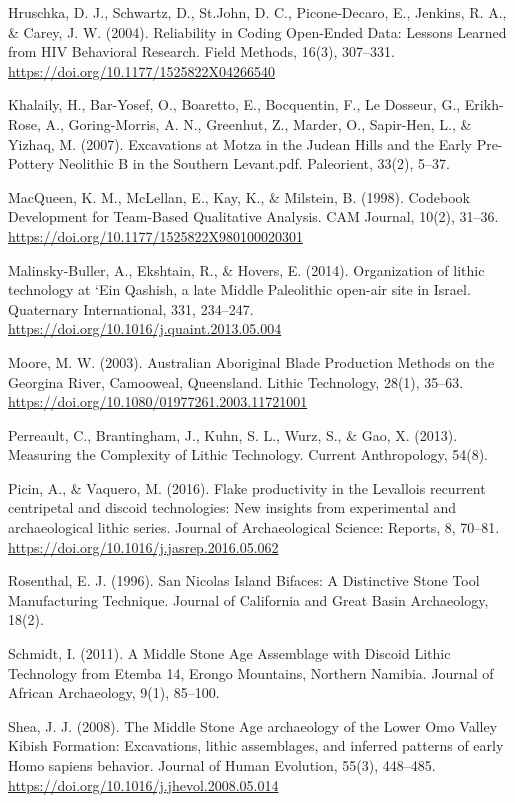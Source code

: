 \documentclass[
]{article}
\begin{document}
Hruschka, D. J., Schwartz, D., St.John, D. C., Picone-Decaro, E.,
Jenkins, R. A., \& Carey, J. W. (2004). Reliability in Coding Open-Ended
Data: Lessons Learned from HIV Behavioral Research. Field Methods,
16(3), 307--331. \url{https://doi.org/10.1177/1525822X04266540}

Khalaily, H., Bar-Yosef, O., Boaretto, E., Bocquentin, F., Le Dosseur,
G., Erikh-Rose, A., Goring-Morris, A. N., Greenhut, Z., Marder, O.,
Sapir-Hen, L., \& Yizhaq, M. (2007). Excavations at Motza in the Judean
Hills and the Early Pre-Pottery Neolithic B in the Southern Levant.pdf.
Paleorient, 33(2), 5--37.

MacQueen, K. M., McLellan, E., Kay, K., \& Milstein, B. (1998). Codebook
Development for Team-Based Qualitative Analysis. CAM Journal, 10(2),
31--36. \url{https://doi.org/10.1177/1525822X980100020301}

Malinsky-Buller, A., Ekshtain, R., \& Hovers, E. (2014). Organization of
lithic technology at `Ein Qashish, a late Middle Paleolithic open-air
site in Israel. Quaternary International, 331, 234--247.
\url{https://doi.org/10.1016/j.quaint.2013.05.004}

Moore, M. W. (2003). Australian Aboriginal Blade Production Methods on
the Georgina River, Camooweal, Queensland. Lithic Technology, 28(1),
35--63. \url{https://doi.org/10.1080/01977261.2003.11721001}

Perreault, C., Brantingham, J., Kuhn, S. L., Wurz, S., \& Gao, X.
(2013). Measuring the Complexity of Lithic Technology. Current
Anthropology, 54(8).

Picin, A., \& Vaquero, M. (2016). Flake productivity in the Levallois
recurrent centripetal and discoid technologies: New insights from
experimental and archaeological lithic series. Journal of Archaeological
Science: Reports, 8, 70--81.
\url{https://doi.org/10.1016/j.jasrep.2016.05.062}

Rosenthal, E. J. (1996). San Nicolas Island Bifaces: A Distinctive Stone
Tool Manufacturing Technique. Journal of California and Great Basin
Archaeology, 18(2).

Schmidt, I. (2011). A Middle Stone Age Assemblage with Discoid Lithic
Technology from Etemba 14, Erongo Mountains, Northern Namibia. Journal
of African Archaeology, 9(1), 85--100.

Shea, J. J. (2008). The Middle Stone Age archaeology of the Lower Omo
Valley Kibish Formation: Excavations, lithic assemblages, and inferred
patterns of early Homo sapiens behavior. Journal of Human Evolution,
55(3), 448--485. \url{https://doi.org/10.1016/j.jhevol.2008.05.014}
\end{document}

